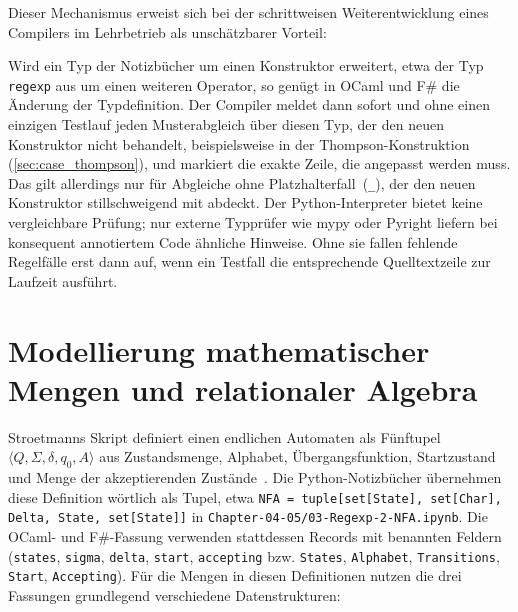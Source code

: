 Dieser Mechanismus erweist sich bei der schrittweisen Weiterentwicklung eines Compilers im Lehrbetrieb als unschätzbarer Vorteil:
\begin{observation}
Wird ein Typ der Notizbücher um einen Konstruktor erweitert, etwa der Typ \texttt{regexp} aus  um einen weiteren Operator, so genügt in OCaml und F\# die Änderung der Typdefinition.
Der Compiler meldet dann sofort und ohne einen einzigen Testlauf jeden Musterabgleich über diesen Typ, der den neuen Konstruktor nicht behandelt, beispielsweise in der Thompson-Konstruktion (\cref{sec:case_thompson}), und markiert die exakte Zeile, die angepasst werden muss.
Das gilt allerdings nur für Abgleiche ohne Platzhalterfall~(\texttt{\_}), der den neuen Konstruktor stillschweigend mit abdeckt.
Der Python-Interpreter bietet keine vergleichbare Prüfung; nur externe Typprüfer wie mypy oder Pyright liefern bei konsequent annotiertem Code ähnliche Hinweise.
Ohne sie fallen fehlende Regelfälle erst dann auf, wenn ein Testfall die entsprechende Quelltextzeile zur Laufzeit ausführt.
\end{observation}

\section{Modellierung mathematischer Mengen und relationaler Algebra}
\label{sec:set_models}

Stroetmanns Skript definiert einen endlichen Automaten als Fünftupel $\langle Q, \Sigma, \delta, q_0, A \rangle$ aus Zustandsmenge, Alphabet, Übergangsfunktion, Startzustand und Menge der akzeptierenden Zustände~\cite{stroetmann2026formal}.
Die Python-Notizbücher übernehmen diese Definition wörtlich als Tupel, etwa \texttt{NFA = tuple[set[State], set[Char], Delta, State, set[State]]} in \texttt{Chapter-04-05/03-Regexp-2-NFA.ipynb}.
Die OCaml- und F\#-Fassung verwenden stattdessen Records mit benannten Feldern (\texttt{states}, \texttt{sigma}, \texttt{delta}, \texttt{start}, \texttt{accepting} bzw. \texttt{States}, \texttt{Alphabet}, \texttt{Transitions}, \texttt{Start}, \texttt{Accepting}).
Für die Mengen in diesen Definitionen nutzen die drei Fassungen grundlegend verschiedene Datenstrukturen:

